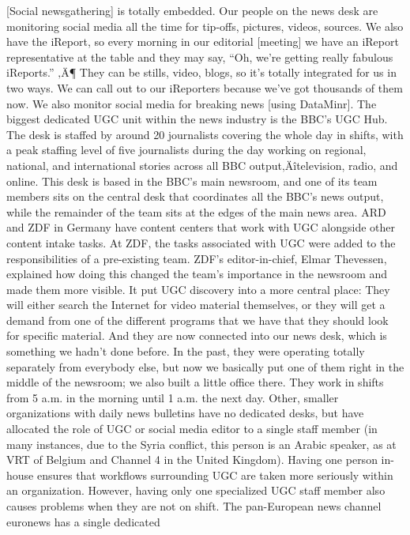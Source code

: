 \documentclass[symmetric, notoc, nobib]{towcenter-book}
\begin{document}
[Social newsgathering] is totally embedded. Our people on the
news desk are monitoring social media all the time for tip-offs, pictures,
videos, sources. We also have the iReport, so every morning
in our editorial [meeting] we have an iReport representative at the
table and they may say, ``Oh, we're getting really fabulous iReports.''
‚Ä¶ They can be stills, video, blogs, so it's totally integrated for us in
two ways. We can call out to our iReporters because we've got thousands
of them now. We also monitor social media for breaking news
[using DataMinr].
The biggest dedicated UGC unit within the news industry is the BBC's UGC
Hub. The desk is staffed by around 20 journalists covering the whole day in
shifts, with a peak staffing level of five journalists during the day working on
regional, national, and international stories across all BBC output‚Äîtelevision,
radio, and online. This desk is based in the BBC's main newsroom, and
one of its team members sits on the central desk that coordinates all the
BBC's news output, while the remainder of the team sits at the edges of the
main news area.
ARD and ZDF in Germany have content centers that work with UGC alongside
other content intake tasks. At ZDF, the tasks associated with UGC were
added to the responsibilities of a pre-existing team. ZDF's editor-in-chief,
Elmar Thevessen, explained how doing this changed the team's importance
in the newsroom and made them more visible. It put UGC discovery into a
more central place:
They will either search the Internet for video material themselves, or
they will get a demand from one of the different programs that we
have that they should look for specific material. And they are now
connected into our news desk, which is something we hadn't done
before. In the past, they were operating totally separately from everybody else, but now we basically put one of them right in the middle
of the newsroom; we also built a little office there. They work in shifts
from 5 a.m. in the morning until 1 a.m. the next day.
Other, smaller organizations with daily news bulletins have no dedicated
desks, but have allocated the role of UGC or social media editor to a single
staff member (in many instances, due to the Syria conflict, this person is an
Arabic speaker, as at VRT of Belgium and Channel 4 in the United Kingdom).
Having one person in-house ensures that workflows surrounding UGC are
taken more seriously within an organization. However, having only one
specialized UGC staff member also causes problems when they are not
on shift. The pan-European news channel euronews has a single dedicated
\end{document}
